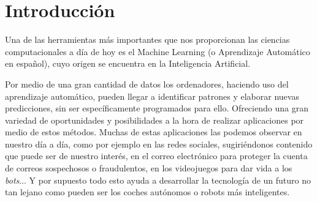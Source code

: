 \documentclass[a4paper, 12pt]{book}
\begin{document}



\tableofcontents 
\cleardoublepage
\listoffigures %
\cleardoublepage
\listoflistings


\cleardoublepage
\chapter{Introducción}
\label{sec:intro}

Una de las herramientas más importantes que nos proporcionan las ciencias computacionales a día de hoy es el Machine Learning (o Aprendizaje Automático en español), cuyo origen se encuentra en la Inteligencia Artificial. 

Por medio de una gran cantidad de datos los ordenadores, haciendo uso del aprendizaje automático, pueden llegar a identificar patrones y elaborar nuevas predicciones, sin ser específicamente programados para ello. Ofreciendo una gran variedad de oportunidades y posibilidades a la hora de realizar aplicaciones por medio de estos métodos. Muchas de estas aplicaciones las podemos observar en nuestro día a día, como por ejemplo en las redes sociales, sugiriéndonos contenido que puede ser de nuestro interés, en el correo electrónico para proteger la cuenta de correos sospechosos o fraudulentos, en los videojuegos para dar vida a los \textit{bots}... Y por supuesto todo esto ayuda a desarrollar la tecnología de un futuro no tan lejano como pueden ser los coches autónomos o robots más inteligentes.
\end{document}
